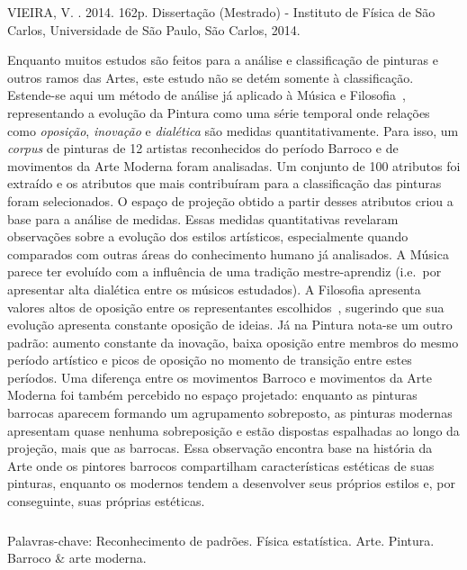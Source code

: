 \begin{resumo2}
\vspace{-10mm}
VIEIRA, V. \textbf{\ABNTtitulodata}. 2014. 162p. Dissertação (Mestrado) - Instituto de Física de São Carlos, Universidade de São Paulo, São Carlos, 2014.
\vspace{15mm}

Enquanto muitos estudos são feitos para a análise e classificação de
pinturas e outros ramos das Artes, este estudo não se detém somente à
classificação. Estende-se aqui um método de análise já aplicado à
Música e Filosofia~\cite{vieira}, representando a evolução da Pintura
como uma série temporal onde relações como \textit{oposição},
\textit{inovação} e \textit{dialética} são medidas
quantitativamente. Para isso, um \textit{corpus} de pinturas de 12
artistas reconhecidos do período Barroco e de movimentos da Arte
Moderna foram analisadas. Um conjunto de 100 atributos foi extraído e
os atributos que mais contribuíram para a classificação das pinturas
foram selecionados. O espaço de projeção obtido a partir desses
atributos criou a base para a análise de medidas. Essas medidas
quantitativas revelaram observações sobre a evolução dos estilos
artísticos, especialmente quando comparados com outras áreas do
conhecimento humano já analisados. A Música parece ter evoluído com a
influência de uma tradição mestre-aprendiz (i.e.\ por apresentar alta
dialética entre os músicos estudados). A Filosofia apresenta valores
altos de oposição entre os representantes escolhidos~\cite{vieira},
sugerindo que sua evolução apresenta constante oposição de ideias. Já
na Pintura nota-se um outro padrão: aumento constante da inovação,
baixa oposição entre membros do mesmo período artístico e picos de
oposição no momento de transição entre estes períodos. Uma diferença
entre os movimentos Barroco e movimentos da Arte Moderna foi também
percebido no espaço projetado: enquanto as pinturas barrocas aparecem
formando um agrupamento sobreposto, as pinturas modernas apresentam
quase nenhuma sobreposição e estão dispostas espalhadas ao longo da
projeção, mais que as barrocas. Essa observação encontra base na
história da Arte onde os pintores barrocos compartilham
características estéticas de suas pinturas, enquanto os modernos
tendem a desenvolver seus próprios estilos e, por conseguinte, suas
próprias estéticas.

$\phantom{linha em branco}$\\ Palavras-chave: Reconhecimento de
padrões. Física estatística. Arte. Pintura. Barroco \& arte
moderna. 

\end{resumo2}



